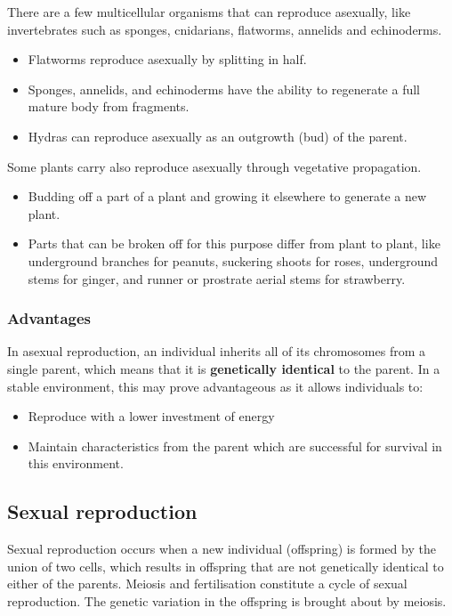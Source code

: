\documentclass[11pt]{article}
\begin{document}
There are a few multicellular organisms that can reproduce asexually, like invertebrates such as sponges, cnidarians, flatworms, annelids and echinoderms.
\begin{itemize}
\item Flatworms reproduce asexually by splitting in half.
\item Sponges, annelids, and echinoderms have the ability to regenerate a full mature body from fragments.
\item Hydras can reproduce asexually as an outgrowth (bud) of the parent.
\end{itemize}

Some plants carry also reproduce asexually through vegetative propagation.
\begin{itemize}
\item Budding off a part of a plant and growing it elsewhere to generate a new plant.
\item Parts that can be broken off for this purpose differ from plant to plant, like underground branches for peanuts, suckering shoots for roses, underground stems for ginger, and runner or prostrate aerial stems for strawberry.
\end{itemize}


\subsubsection{Advantages}
\label{sec:org44638f5}
In asexual reproduction, an individual inherits all of its chromosomes from a single parent, which means that it is \textbf{genetically identical} to the parent. In a stable environment, this may prove advantageous as it allows individuals to:
\begin{itemize}
\item Reproduce with a lower investment of energy
\item Maintain characteristics from the parent which are successful for survival in this environment.
\end{itemize}

\subsection{Sexual reproduction}
\label{sec:orgd273004}
Sexual reproduction occurs when a new individual (offspring) is formed by the union of two cells, which results in offspring that are not genetically identical to either of the parents. Meiosis and fertilisation constitute a cycle of sexual reproduction. The genetic variation in the offspring is brought about by meiosis.
\\[0pt]
\end{document}
